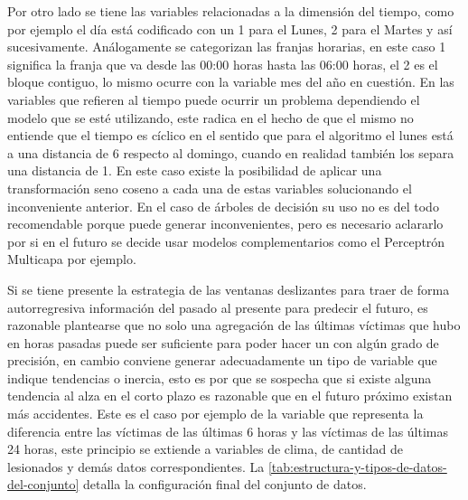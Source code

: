 Por otro lado se tiene las variables relacionadas a la dimensión del tiempo, como por ejemplo el día está codificado con un 1 para el Lunes, 2 para el Martes y así sucesivamente. Análogamente se categorizan las franjas horarias, en este caso 1 significa la franja que va desde las 00:00 horas hasta las 06:00 horas, el 2 es el bloque contiguo, lo mismo ocurre con la variable mes del año en cuestión. En las variables que refieren al tiempo puede ocurrir un problema dependiendo el modelo que se esté utilizando, este radica en el hecho de que el mismo no entiende que el tiempo es cíclico en el sentido que para el algoritmo el lunes está a una distancia de 6 respecto al domingo, cuando en realidad también los separa una distancia de 1. En este caso existe la posibilidad de aplicar una transformación seno coseno a cada una de estas variables solucionando el inconveniente anterior. En el caso de árboles de decisión su uso no es del todo recomendable porque puede generar inconvenientes, pero es necesario aclararlo por si en el futuro se decide usar modelos complementarios como el Perceptrón Multicapa por ejemplo.

Si se tiene presente la estrategia de las ventanas deslizantes para traer de forma autorregresiva información del pasado al presente para predecir el futuro, es razonable plantearse que no solo una agregación de las últimas víctimas que hubo en horas pasadas puede ser suficiente para poder hacer un  con algún grado de precisión, en cambio conviene generar adecuadamente un tipo de variable que indique tendencias o inercia, esto es por que se sospecha que si existe alguna tendencia al alza en el corto plazo es razonable que en el futuro próximo existan más accidentes. Este es el caso por ejemplo de la variable  que representa la diferencia entre las víctimas de las últimas 6 horas y las víctimas de las últimas 24 horas, este principio se extiende a variables de clima, de cantidad de lesionados y demás datos correspondientes. La \cref{tab:estructura-y-tipos-de-datos-del-conjunto} detalla la configuración final del conjunto de datos.

